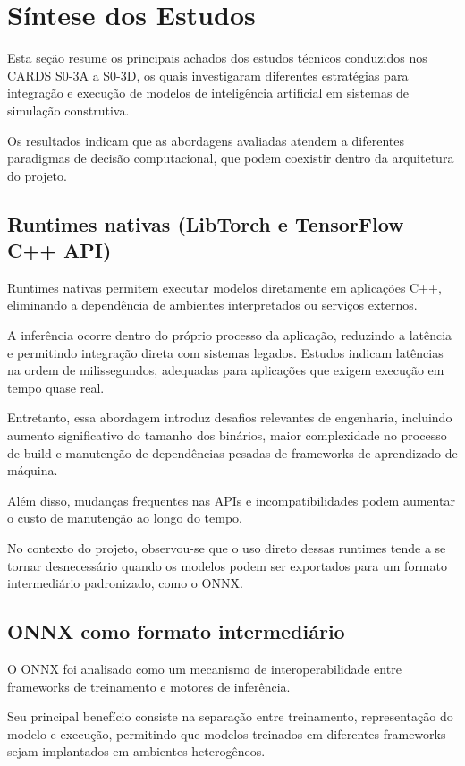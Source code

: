 \section{Síntese dos Estudos}

Esta seção resume os principais achados dos estudos técnicos conduzidos nos CARDS S0-3A a S0-3D,
os quais investigaram diferentes estratégias para integração e execução de modelos de inteligência
artificial em sistemas de simulação construtiva.

Os resultados indicam que as abordagens avaliadas atendem a diferentes paradigmas de decisão
computacional, que podem coexistir dentro da arquitetura do projeto.

\subsection{Runtimes nativas (LibTorch e TensorFlow C++ API)}

Runtimes nativas permitem executar modelos diretamente em aplicações C++, eliminando a
dependência de ambientes interpretados ou serviços externos.

A inferência ocorre dentro do próprio processo da aplicação, reduzindo a latência e permitindo
integração direta com sistemas legados. Estudos indicam latências na ordem de milissegundos,
adequadas para aplicações que exigem execução em tempo quase real.

Entretanto, essa abordagem introduz desafios relevantes de engenharia, incluindo aumento
significativo do tamanho dos binários, maior complexidade no processo de build e manutenção
de dependências pesadas de frameworks de aprendizado de máquina.

Além disso, mudanças frequentes nas APIs e incompatibilidades podem aumentar o custo
de manutenção ao longo do tempo.

No contexto do projeto, observou-se que o uso direto dessas runtimes tende a se tornar
desnecessário quando os modelos podem ser exportados para um formato intermediário
padronizado, como o ONNX.


\subsection{ONNX como formato intermediário}

O ONNX foi analisado como um mecanismo de interoperabilidade entre frameworks de treinamento
e motores de inferência.

Seu principal benefício consiste na separação entre treinamento, representação do modelo e
execução, permitindo que modelos treinados em diferentes frameworks sejam implantados em
ambientes heterogêneos.

